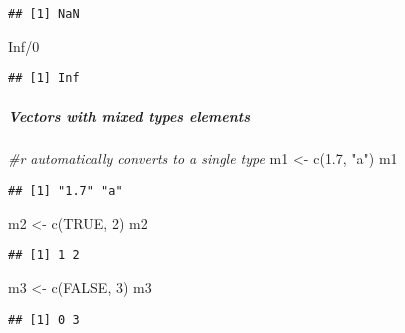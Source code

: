 \documentclass[
]{article}
\newenvironment{Shaded}{\begin{snugshade}}{\end{snugshade}}
\newcommand{\CommentTok}[1]{\textcolor[rgb]{0.56,0.35,0.01}{\textit{#1}}}
\newcommand{\ConstantTok}[1]{\textcolor[rgb]{0.00,0.00,0.00}{#1}}
\newcommand{\DecValTok}[1]{\textcolor[rgb]{0.00,0.00,0.81}{#1}}
\newcommand{\FloatTok}[1]{\textcolor[rgb]{0.00,0.00,0.81}{#1}}
\newcommand{\FunctionTok}[1]{\textcolor[rgb]{0.00,0.00,0.00}{#1}}
\newcommand{\NormalTok}[1]{#1}
\newcommand{\OtherTok}[1]{\textcolor[rgb]{0.56,0.35,0.01}{#1}}
\newcommand{\SpecialCharTok}[1]{\textcolor[rgb]{0.00,0.00,0.00}{#1}}
\newcommand{\StringTok}[1]{\textcolor[rgb]{0.31,0.60,0.02}{#1}}
\begin{document}
\begin{verbatim}
## [1] NaN
\end{verbatim}

\begin{Shaded}
\begin{Highlighting}[]
\ConstantTok{Inf}\SpecialCharTok{/}\DecValTok{0}
\end{Highlighting}
\end{Shaded}

\begin{verbatim}
## [1] Inf
\end{verbatim}

\hypertarget{vectors-with-mixed-types-elements}{%
\subparagraph{Vectors with mixed types
elements}\label{vectors-with-mixed-types-elements}}

\begin{Shaded}
\begin{Highlighting}[]
\CommentTok{\#r automatically converts to a single type}
\NormalTok{m1 }\OtherTok{\textless{}{-}} \FunctionTok{c}\NormalTok{(}\FloatTok{1.7}\NormalTok{, }\StringTok{"a"}\NormalTok{)}
\NormalTok{m1}
\end{Highlighting}
\end{Shaded}

\begin{verbatim}
## [1] "1.7" "a"
\end{verbatim}

\begin{Shaded}
\begin{Highlighting}[]
\NormalTok{m2 }\OtherTok{\textless{}{-}} \FunctionTok{c}\NormalTok{(}\ConstantTok{TRUE}\NormalTok{, }\DecValTok{2}\NormalTok{)}
\NormalTok{m2}
\end{Highlighting}
\end{Shaded}

\begin{verbatim}
## [1] 1 2
\end{verbatim}

\begin{Shaded}
\begin{Highlighting}[]
\NormalTok{m3 }\OtherTok{\textless{}{-}} \FunctionTok{c}\NormalTok{(}\ConstantTok{FALSE}\NormalTok{, }\DecValTok{3}\NormalTok{)}
\NormalTok{m3}
\end{Highlighting}
\end{Shaded}

\begin{verbatim}
## [1] 0 3
\end{verbatim}
\end{document}
